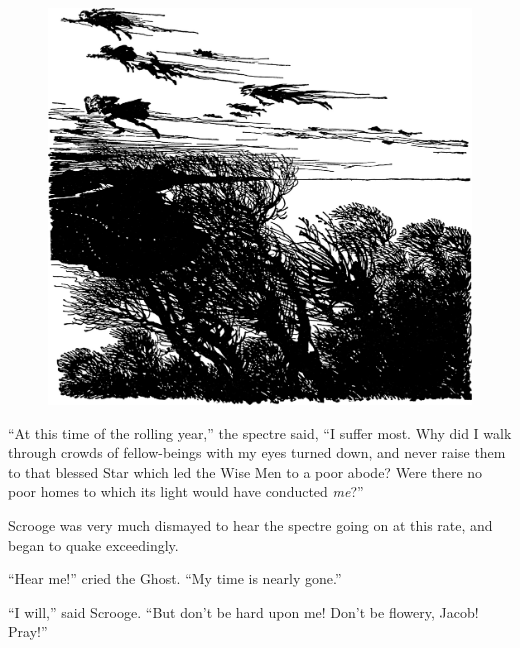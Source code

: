 \documentclass[paper=5.5in:8.5in,BCOR=7mm,twoside,DIV=calc,12pt,usegeometry]{scrbook} %
\begin{document}
\begin{figure}[b!]
\centering
     \includegraphics[width=\columnwidth]{wingsofwind2}
 \end{figure}


\enquote{At this time of the rolling year,} the spectre said, \enquote{I suffer most. Why did I walk through crowds of fellow-beings with my eyes turned down, and never raise them to that blessed Star which led the Wise Men to a poor abode? Were there no poor homes to which its light would have conducted \textit{me}?}



Scrooge was very much dismayed to hear the spectre going on at this rate, and began to quake exceedingly.

\enquote{Hear me!} cried the Ghost. \enquote{My time is nearly gone.}

\enquote{I will,} said Scrooge. \enquote{But don't be hard upon me! Don't be flowery, Jacob! Pray!}

\end{document}
